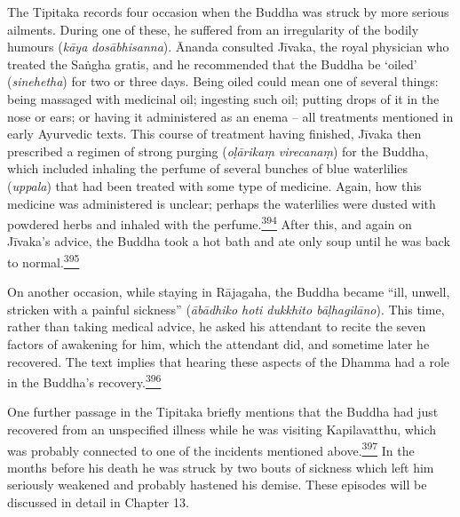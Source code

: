 The Tipitaka records four occasion when the Buddha was struck by more
serious ailments. During one of these, he suffered from an irregularity
of the bodily humours (\emph{kāya} \emph{dosābhisanna}). Ānanda
consulted Jīvaka, the royal physician who treated the Saṅgha gratis, and
he recommended that the Buddha be `oiled' (\emph{sinehetha}) for two or
three days. Being oiled could mean one of several things: being massaged
with medicinal oil; ingesting such oil; putting drops of it in the nose
or ears; or having it administered as an enema -- all treatments
mentioned in early Ayurvedic texts. This course of treatment having
finished, Jīvaka then prescribed a regimen of strong purging
(\emph{oḷārikaṃ virecanaṃ}) for the Buddha, which included inhaling the
perfume of several bunches of blue waterlilies (\emph{uppala}) that had
been treated with some type of medicine. Again, how this medicine was
administered is unclear; perhaps the waterlilies were dusted with
powdered herbs and inhaled with the
perfume.\label{footprints_split_011.html_fnref394}\hyperref[footprints_split_024.htmlux5cux23fn394]{\textsuperscript{394}}
After this, and again on Jīvaka's advice, the Buddha took a hot bath and
ate only soup until he was back to
normal.\label{footprints_split_011.html_fnref395}\hyperref[footprints_split_024.htmlux5cux23fn395]{\textsuperscript{395}}

On another occasion, while staying in Rājagaha, the Buddha became ``ill,
unwell, stricken with a painful sickness'' (\emph{ābādhiko hoti dukkhito
bāḷhagilāno}). This time, rather than taking medical advice, he asked
his attendant to recite the seven factors of awakening for him, which
the attendant did, and sometime later he recovered. The text implies
that hearing these aspects of the Dhamma had a role in the Buddha's
recovery.\label{footprints_split_011.html_fnref396}\hyperref[footprints_split_024.htmlux5cux23fn396]{\textsuperscript{396}}

One further passage in the Tipitaka briefly mentions that the Buddha had
just recovered from an unspecified illness while he was visiting
Kapilavatthu, which was probably connected to one of the incidents
mentioned
above.\label{footprints_split_011.html_fnref397}\hyperref[footprints_split_024.htmlux5cux23fn397]{\textsuperscript{397}}
In the months before his death he was struck by two bouts of sickness
which left him seriously weakened and probably hastened his demise.
These episodes will be discussed in detail in {Chapter 13}.

